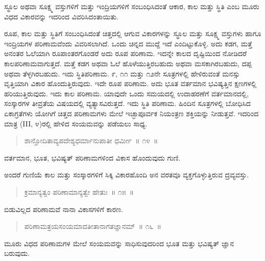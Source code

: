 ಸ್ಥೂಲ ಅಥವಾ ಸೂಕ್ಷ್ಮ ವಸ್ತುಗಳಿಗೆ ಮತ್ತು ಇಂದ್ರಿಯಗಳಿಗೆ ಸಂಬಂಧಿಸಿದಂತೆ ಆಕಾರ, ಕಾಲ ಮತ್ತು ಸ್ಥಿತಿ ಎಂಬ ಮೂರು ವಿಧದ ವಿಕಾರವನ್ನು ಇದರಿಂದ ವಿವರಿಸಿದಂತಾಯಿತು. 

ರೂಪ, ಕಾಲ ಮತ್ತು ಸ್ಥಿತಿಗೆ ಸಂಬಂಧಿಸಿದಂತೆ ಚಿತ್ತದಲ್ಲಿ ಆಗುವ ವಿಕಾರಗಳನ್ನು ಸ್ಥೂಲ ಮತ್ತು ಸೂಕ್ಷ್ಮ ವಸ್ತುಗಳು ಹಾಗೂ ಇಂದ್ರಿಯಗಳ ಪರಿಣಾಮವೆಂದು ವಿವರಿಸಲಾಗಿದೆ. ಒಂದು ಚಿನ್ನದ ಮುದ್ದೆ ಇದೆ ಎಂದಿಟ್ಟುಕೊಳ್ಳಿ. ಅದು ಕಡಗ, ಮತ್ತೆ ಅನಂತರ ಓಲೆಯಾಗಿ ರೂಪಾಂತರಗೊಂಡರೆ ಅದು ರೂಪ ಪರಿಣಾಮ. ಇದನ್ನೇ ಕಾಲದ ದೃಷ್ಟಿಯಿಂದ ನೋಡಿದರೆ ಕಾಲಪರಿಣಾಮವಾಗುತ್ತದೆ. ಮತ್ತೆ ಕಡಗ ಅಥವಾ ಓಲೆ ಹೊಳೆಯುತ್ತಿರಬಹುದು ಅಥವಾ ಮಸಕಾಗಿರಬಹುದು, ದಪ್ಪ ಅಥವಾ ತೆಳ್ಳಗಿರಬಹುದು. ಇದು ಸ್ಥಿತಿಪರಿಣಾಮ. ೯, ೧೧ ಮತ್ತು ೧೨ನೇ ಸೂತ್ರಗಳಲ್ಲಿ ಹೇಳಿರುವಂತೆ ಮನಸ್ಸು ವೃತ್ತಿಯಾಗಿ ವಿಕಾರ ಹೊಂದುತ್ತಿರುವುದು. ಇದೇ ರೂಪ ಪರಿಣಾಮ. ಅದು ಭೂತ ವರ್ತಮಾನ ಭವಿಷ್ಯತ್ತಿನ ಕ್ಷಣಗಳಲ್ಲಿ ಹರಿಯುತ್ತಿರುವುದು. ಇದು ಕಾಲ ಪರಿಣಾಮ. ಯಾವುದೇ ಒಂದು ಸಮಯದಲ್ಲಿ ಉದಾಹರಣೆಗೆ ವರ್ತಮಾನದಲ್ಲಿ, ಸಂಸ್ಕಾರಗಳ ತೀವ್ರತೆಯ ವಿಷಯದಲ್ಲಿ ವ್ಯತ್ಯಾಸವಿರುತ್ತದೆ. ಇದು ಸ್ಥಿತಿ ಪರಿಣಾಮ. ಹಿಂದಿನ ಸೂತ್ರಗಳಲ್ಲಿ ಬೋಧಿಸಿದ ಏಕಾಗ್ರತೆಗಳು ಯೋಗಿಗೆ ಚಿತ್ತದ ಪರಿಣಾಮಗಳು ಮೇಲೆ ಇಚ್ಛಾಪೂರ್ವಕ ನಿಯಂತ್ರಣ ಶಕ್ತಿಯನ್ನು ನೀಡುತ್ತವೆ. ಇದರಿಂದ ಮಾತ್ರ (III, ೪)ರಲ್ಲಿ ಹೇಳಿದ ಸಂಯಮವನ್ನು ಪಡೆಯಲು ಸಾಧ್ಯ. 

\vspace{-0.3cm}

\begin{verse}
ಶಾನ್ತೋದಿತಾವ್ಯಪದೇಶ್ಯಧರ್ಮಾನುಪಾತೀ ಧರ್ಮೀ~॥ ೧೪~॥
\end{verse}

\vspace{-0.3cm}

ವರ್ತಮಾನ, ಭೂತ, ಭವಿಷ್ಯತ್​ ಪರಿಣಾಮಗಳಿಂದ ವಿಕಾಸ ಹೊಂದುವುದು ಗುಣಿ. 

ಅಂದರೆ ಗುಣಿಯೆ ಕಾಲ ಮತ್ತು ಸಂಸ್ಕಾರಗಳಿಗೆ ಸಿಕ್ಕಿ ವಿಕಾರಹೊಂದಿ ಅನ ವರತವೂ ವ್ಯಕ್ತಗೊಳ್ಳುತ್ತಿರುವ ದ್ರವ್ಯವಸ್ತು. 

\vspace{-0.3cm}

\begin{verse}
ಕ್ರಮಾನ್ಯತ್ವಂ ಪರಿಣಾಮಾನ್ಯತ್ವೇ ಹೇತುಃ~॥ ೧೫~॥
\end{verse}

\vspace{-0.3cm}

ಬಿಡುವಿಲ್ಲದ ಪರಿಣಾಮವೆ ನಾನಾ ವಿಕಾಸಗಳಿಗೆ ಕಾರಣ. 

\vspace{-0.3cm}

\begin{verse}
ಪರಿಣಾಮತ್ರಯಸಂಯಮಾದತೀತಾನಾಗತಜ್ಞಾನಮ್​~॥ ೧೬~॥
\end{verse}

\vspace{-0.3cm}

ಮೂರು ವಿಧದ ಪರಿಣಾಮಗಳ ಮೇಲೆ ಸಂಯಮವನ್ನು ಸಾಧಿಸುವುದರಿಂದ ಭೂತ ಮತ್ತು ಭವಿಷ್ಯತ್​ ಜ್ಞಾನ ಬರುವುದು. 

